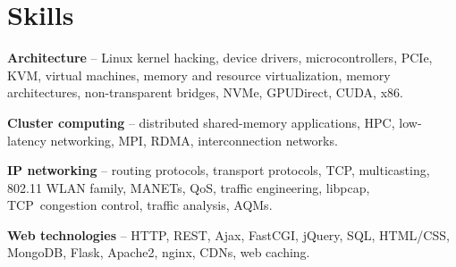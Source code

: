 
\section{Skills}
\begin{small}
	\parbox[t][][t]{\linewidth}{
		\textbf{Architecture} -- Linux kernel hacking, device drivers,
		microcontrollers,
		PCIe, KVM, virtual machines, memory and resource virtualization,
		memory architectures, non-transparent bridges, 
		NVMe, GPUDirect, CUDA, x86.
		\bigbreak
	}
	\parbox[t][][t]{\linewidth}{
		\textbf{Cluster computing} -- distributed shared-memory applications, HPC, low-latency
		networking, MPI, RDMA, interconnection networks.
		\bigbreak
	}
	\parbox[t][][t]{\linewidth}{
		\textbf{IP networking} -- routing protocols, transport protocols, TCP,
		multicasting, 802.11 WLAN family, MANETs, QoS, 
		traffic engineering, libpcap, TCP~congestion control, traffic
		analysis, AQMs. 
		\bigbreak
	}
	\parbox[t][][t]{\linewidth}{
		\textbf{Web technologies} -- HTTP, REST, Ajax, FastCGI, jQuery, 
		SQL, HTML/CSS, MongoDB, Flask, Apache2, nginx, CDNs, web caching.
	}
	\bigskip
\end{small}
